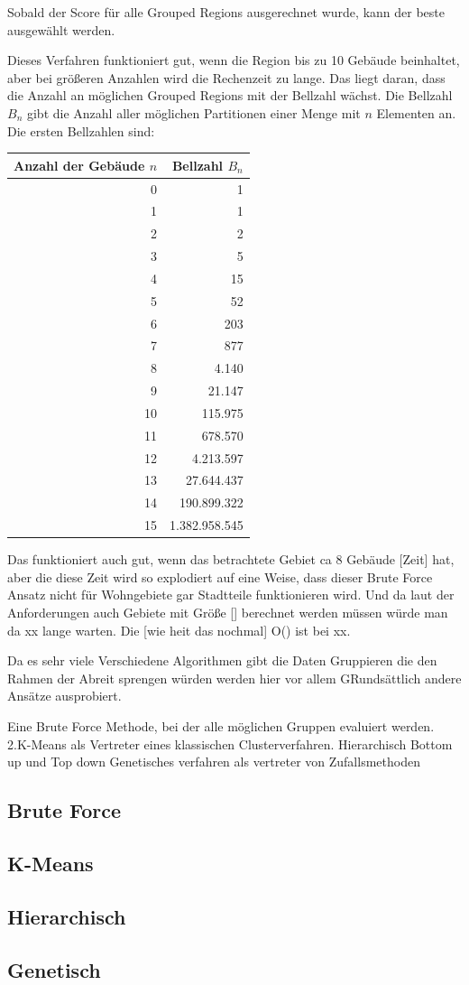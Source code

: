 Sobald der Score für alle Grouped Regions ausgerechnet wurde, kann der beste ausgewählt werden.

Dieses Verfahren funktioniert gut, wenn die Region bis zu 10 Gebäude beinhaltet, aber bei größeren Anzahlen wird die Rechenzeit zu lange. Das liegt daran, dass die Anzahl an möglichen Grouped Regions mit der Bellzahl wächst. Die Bellzahl $B_n$ gibt die Anzahl aller möglichen Partitionen einer Menge mit $n$ Elementen an. Die ersten Bellzahlen sind:

\begin{center}
\begin{tabular}{r|r}
    Anzahl der Gebäude $n$ & Bellzahl $B_n$ \\
    \hline
    0  & 1 \\
    1  & 1 \\
    2  & 2 \\
    3  & 5 \\
    4  & 15 \\
    5  & 52 \\
    6  & 203 \\
    7  & 877 \\
    8  & 4.140 \\
    9  & 21.147 \\
    10 & 115.975 \\
    11 & 678.570 \\
    12 & 4.213.597 \\
    13 & 27.644.437 \\
    14 & 190.899.322 \\
    15 & 1.382.958.545
\end{tabular}
\end{center}

Das funktioniert auch gut, wenn das betrachtete Gebiet ca 8 Gebäude  [Zeit] hat, aber die diese Zeit wird so explodiert auf eine Weise, dass dieser Brute Force Ansatz nicht für Wohngebiete gar Stadtteile funktionieren wird. Und da laut der Anforderungen auch Gebiete mit Größe [] berechnet werden müssen würde man da xx lange warten. Die [wie heit das nochmal] O() ist bei xx.

Da es sehr viele Verschiedene Algorithmen gibt die Daten Gruppieren die den Rahmen der Abreit sprengen würden werden hier vor allem GRundsättlich andere Ansätze ausprobiert.

Eine Brute Force Methode, bei der alle möglichen Gruppen evaluiert werden.
2.K-Means als Vertreter eines klassischen Clusterverfahren.
Hierarchisch Bottom up und Top down
Genetisches verfahren als vertreter von Zufallsmethoden

\subsection{Brute Force}
\subsection{K-Means}
\subsection{Hierarchisch}
\subsection{Genetisch}


